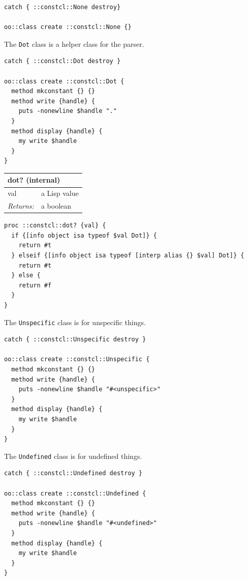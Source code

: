\documentclass[twoside,9pt]{report}
\begin{document}
\noindent\makebox[\linewidth]{\rule{\linewidth}{0.4pt}}
\begin{lstlisting}
catch { ::constcl::None destroy}
 
oo::class create ::constcl::None {}
\end{lstlisting}
\noindent\makebox[\linewidth]{\rule{\linewidth}{0.4pt}}

The \texttt{Dot} class is a helper class for the parser.

\noindent\makebox[\linewidth]{\rule{\linewidth}{0.4pt}}
\begin{lstlisting}
catch { ::constcl::Dot destroy }
 
oo::class create ::constcl::Dot {
  method mkconstant {} {}
  method write {handle} {
    puts -nonewline $handle "."
  }
  method display {handle} {
    my write $handle
  }
}
\end{lstlisting}
\noindent\makebox[\linewidth]{\rule{\linewidth}{0.4pt}}
\begin{tabular}{ |l l| }
\hline
\multicolumn{2}{|l|}{dot? (internal)} \\
\hline
val & a Lisp value \\
\textit{Returns:} & a boolean \\
\hline
\end{tabular}

\noindent\makebox[\linewidth]{\rule{\linewidth}{0.4pt}}
\begin{lstlisting}
proc ::constcl::dot? {val} {
  if {[info object isa typeof $val Dot]} {
    return #t
  } elseif {[info object isa typeof [interp alias {} $val] Dot]} {
    return #t
  } else {
    return #f
  }
}
\end{lstlisting}
\noindent\makebox[\linewidth]{\rule{\linewidth}{0.4pt}}

The \texttt{Unspecific} class is for unspecific things.

\noindent\makebox[\linewidth]{\rule{\linewidth}{0.4pt}}
\begin{lstlisting}
catch { ::constcl::Unspecific destroy }
 
oo::class create ::constcl::Unspecific {
  method mkconstant {} {}
  method write {handle} {
    puts -nonewline $handle "#<unspecific>"
  }
  method display {handle} {
    my write $handle
  }
}
\end{lstlisting}
\noindent\makebox[\linewidth]{\rule{\linewidth}{0.4pt}}

The \texttt{Undefined} class is for undefined things.

\noindent\makebox[\linewidth]{\rule{\linewidth}{0.4pt}}
\begin{lstlisting}
catch { ::constcl::Undefined destroy }
 
oo::class create ::constcl::Undefined {
  method mkconstant {} {}
  method write {handle} {
    puts -nonewline $handle "#<undefined>"
  }
  method display {handle} {
    my write $handle
  }
}
\end{lstlisting}
\noindent\makebox[\linewidth]{\rule{\linewidth}{0.4pt}}
\end{document}
